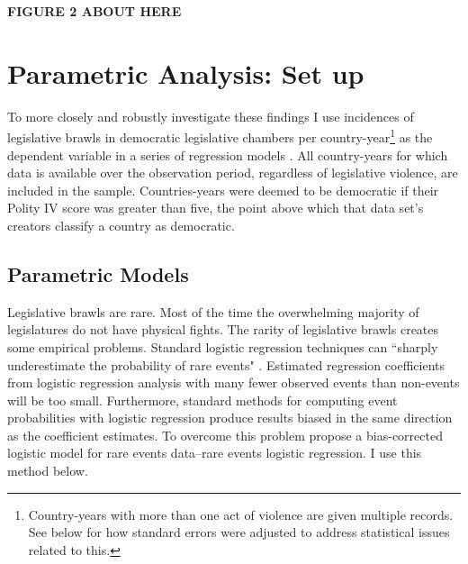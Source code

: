 \documentclass[a4paper]{article}\usepackage[]{graphicx}\usepackage[]{color}
\begin{document}
\vspace{0.5cm}

\textbf{FIGURE 2 ABOUT HERE}

\vspace{0.5cm}

\section*{Parametric Analysis: Set up}

To more closely and robustly investigate these findings I use incidences of legislative brawls in democratic legislative chambers per country-year\footnote{Country-years with more than one act of violence are given multiple records. See below for how standard errors were adjusted to address statistical issues related to this.} as the dependent variable in a series of regression models \citep{KingRareEvents2001, KingRareEventsPA2001}. All country-years for which data is available over the observation period, regardless of legislative violence, are included in the sample. Countries-years were deemed to be democratic if their Polity IV score \citep{Marshall2009} was greater than five, the point above which that data set's creators classify a country as democratic.

\subsection*{Parametric Models}

Legislative brawls are rare. Most of the time the overwhelming majority of legislatures do not have physical fights. The rarity of legislative brawls creates some empirical problems. Standard logistic regression techniques can ``sharply underestimate the probability of rare events" \cite[137]{KingRareEventsPA2001}. Estimated regression coefficients from logistic regression analysis with many fewer observed events than non-events will be too small. Furthermore, standard methods for computing event probabilities with logistic regression produce results biased in the same direction as the coefficient estimates. To overcome this problem \cite{KingRareEvents2001,KingRareEventsPA2001} propose a bias-corrected logistic model for rare events data--rare events logistic regression. I use this method below.

\end{document}
